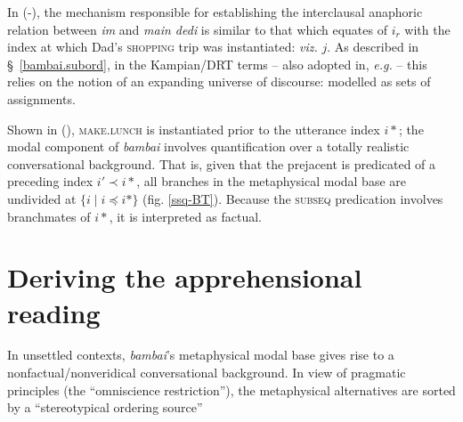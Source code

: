 \xe


\noindent In (-), the mechanism responsible for establishing the interclausal anaphoric relation between \textit{im} and \textit{main dedi} is similar to that which equates of $ i_r $ with the index at which Dad's \textsc{shopping} trip was instantiated: \textit{viz.} $ j $. As described in \S~\ref{bambai.subord}, in the Kampian/DRT terms \citep[\textit{e.g.},][Ch. 5]{Kamp1993} -- also adopted in, \textit{e.g.} \citealp{Partee} -- this relies on the notion of an expanding universe of discourse: modelled as sets of assignments.


Shown in (), \textsc{make.lunch} is instantiated prior to the utterance index $ i* $; the modal component of \textit{bambai} involves quantification over a totally realistic conversational background. That is, given that the prejacent is predicated of a preceding index $ i'\prec i* $, all branches in the metaphysical modal base are undivided at $ \{i\mid i\preccurlyeq i*\} $ (fig. \ref{ssq-BT}). Because the \textsc{subseq} predication involves branchmates of $ i* $, it is interpreted as factual.


\section{Deriving the apprehensional reading}

In unsettled contexts, \textit{bambai}'s metaphysical modal base gives rise to a nonfactual/nonveridical conversational background. In view of pragmatic principles (the ``omniscience restriction''), the metaphysical alternatives are sorted by a ``stereotypical ordering source'' \citetext{\citealp[\textit{e.g.},][37\textit{ff}]{Kratzer2012} \textit{i.a.}.} 







